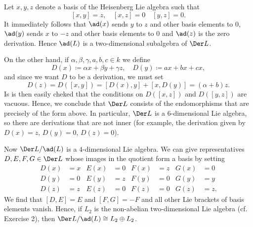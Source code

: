 Let $x, y, z$ denote a basis of the Heisenberg Lie algebra such that
\[ [x, y] = z,\quad [x, z] = 0\quad [y, z] = 0. \]
It immediately follows that $\ad(x)$ sends $y$ to $z$ and other basis elements
to $0$, $\ad(y)$ sends $x$ to $-z$ and other basis elements to $0$ and $\ad(z)$
is the zero derivation. Hence $\ad(L)$ is a two-dimensional subalgebra of
$\Der L$.

On the other hand, if $\alpha, \beta, \gamma, a, b, c \in k$ we define
\[ D(x) \coloneqq \alpha x + \beta y + \gamma z,\quad D(y)\coloneqq ax + bx + cx, \]
and since we want $D$ to be a derivation, we must set
\[ D(z) = D([x, y]) = [D(x), y] + [x, D(y)] = (\alpha + b)z. \]
Is is then easily cheked that the conditions on $D([x, z])$ and $D([y, z])$
are vacuous. Hence, we conclude that $\Der L$ consists of the endomorphisms that
are precisely of the form above. In particular, $\Der L$ is a 6-dimensional Lie
algebra, so there are derivations that are not inner (for example, the derivation
given by $D(x) = z$,  $D(y) = 0$, $D(z) = 0$).

Now $\Der L/\ad(L)$ is a $4$-dimensional Lie algebra. We can give representatives
$D, E, F, G \in \Der L$ whose images in the quotient form a basis by setting
\begin{align*}
	D(x) &= x & E(x) &= 0 & F(x) &= z & G(x) &= 0\\
	D(y) &= 0 & E(y) &= z & F(y) &= 0 & G(y) &= y\\
	D(z) &= z & E(z) &= 0 & F(z) &= 0 & G(z) &= z.
\end{align*}
We find that $[D, E] = E$ and $[F, G] = -F$ and all other Lie brackets of basis
elements vanish. Hence, if $L_2$ is the non-abelian
two-dimensional Lie algebra (cf. Exercise 2), then $\Der L/\ad(L) \cong L_2 \oplus L_2$.
